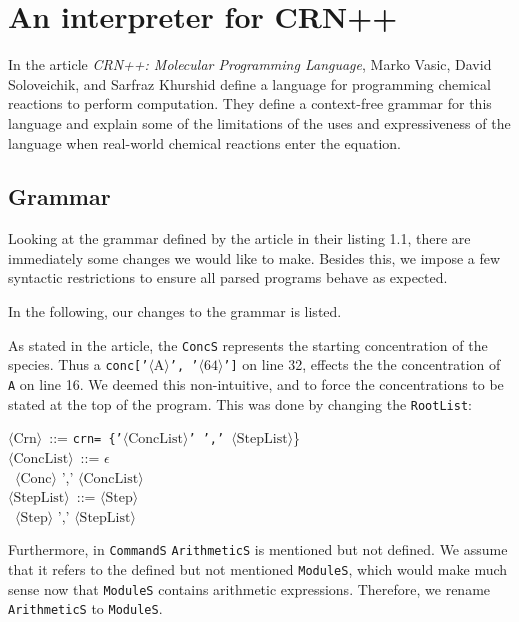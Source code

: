 \section{An interpreter for CRN++}

In the article \textit{CRN++: Molecular Programming Language}, Marko Vasic, David Soloveichik, and Sarfraz Khurshid define a language for programming chemical reactions to perform computation. They define a context-free grammar for this language and explain some of the limitations of the uses and expressiveness of the language when real-world chemical reactions enter the equation. 


\subsection{Grammar}

Looking at the grammar defined by the article in their listing 1.1, there are immediately some changes we would like to make. Besides this, we impose a few syntactic restrictions to ensure all parsed programs behave as expected. 

In the following, our changes to the grammar is listed. 




As stated in the article, the \texttt{ConcS} represents the starting concentration of the species. Thus a \texttt{conc['$\langle \text{A} \rangle$', '$\langle \text{64} \rangle$']} on line 32, effects the the concentration of \texttt{A} on line 16. We deemed this non-intuitive, and to force the concentrations to be stated at the top of the program. This was done by changing the \texttt{RootList}:
\begin{tabbing}
    $\langle \text{Crn} \rangle$ \,::=\; \= \texttt{crn= \{'$\langle \text{ConcList} \rangle$' ',' $\langle \text{StepList} \rangle$}\} \\
    
    $\langle \text{ConcList} \rangle$ \,::=\;  $ \epsilon$ \\
    
     \>\textbar \, $\langle \text{Conc} \rangle$ ',' $\langle \text{ConcList} \rangle$ \\

      $\langle \text{StepList} \rangle$ \,::=\;  $\langle \text{Step} \rangle$ \\

      \>\textbar \, $\langle \text{Step} \rangle$ ',' $\langle \text{StepList} \rangle$ \\
\end{tabbing}
Furthermore, in \texttt{CommandS} \texttt{ArithmeticS} is mentioned but not defined. We assume that it refers to the defined but not mentioned \texttt{ModuleS}, which would make much sense now that \texttt{ModuleS} contains arithmetic expressions. Therefore, we rename \texttt{ArithmeticS} to \texttt{ModuleS}.\\

